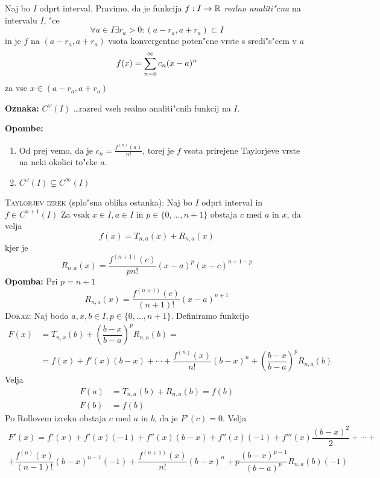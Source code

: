  Naj bo $I$ odprt interval. Pravimo, da je funkcija $f: I \to \mathbb{R}$ \emph{realno analiti"cna} na intervalu $I$, "ce
\begin{equation*}
\forall a \in I \exists r_a > 0: (a - r_a, a + r_a) \subset I
\end{equation*}
in je $f$ na $(a - r_a, a + r_a)$ vsota konvergentne poten"cne vrste s sredi"s"cem v $a$
\begin{equation*}
f(x) = \sum_{n = 0}^{\infty} c_n (x - a)^n
\end{equation*}
za vse $x \in (a - r_a, a + r_a)$

\textbf{Oznaka:} $C^\omega (I)$ \dots razred vseh realno analiti"cnih funkcij na $I$.

\textbf{Opombe:}
\begin{enumerate}
    \item Od prej vemo, da je $c_n = \frac{f^{(n)} (a)}{n!}$, torej je $f$ vsota prirejene Taylorjeve vrste na neki okolici to"cke $a$.
    \item $C^\omega (I) \subsetneq C^\infty (I)$
\end{enumerate}
%
\textsc{Taylorjev izrek} (splo"sna oblika ostanka): Naj bo $I$ odprt interval in $f \in C^{n+1}(I)$ Za vsak $x \in I, a \in I$ in $p \in \{ 0, \ldots, n + 1 \}$ obstaja $c$ med $a$ in $x$, da velja
\begin{equation*}
f(x) = T_{n, a}(x) + R_{n, a}(x)
\end{equation*}
kjer je
\begin{equation*}
R_{n, a}(x) = \dfrac{f^{(n+1)} (c)}{p n!} (x-a)^p (x-c)^{n+1 - p}
\end{equation*}
\textbf{Opomba:} Pri $p = n+1$
\begin{equation*}
R_{n, a}(x) = \dfrac{f^{(n+1)} (c)}{(n+1)!} (x - a)^{n+1}
\end{equation*}
\textsc{Dokaz:} Naj bodo $a, x, b \in I, p \in \{ 0, \ldots, n+1 \}$. Definiramo funkcijo
\begin{align*}
F(x) &= T_{n, x} (b) + \left( \dfrac{b - x}{b - a} \right)^p R_{n, a}(b) = \\
&= f(x) + f'(x) (b-x) + \cdots + \dfrac{f^{(n)}(x)}{n!} (b - x)^n + \left( \dfrac{b-x}{b-a} \right)^p R_{n, a}(b)
\end{align*}
Velja
\begin{align*}
F(a) &= T_{n, a}(b) + R_{n, a}(b) = f(b) \\
F(b) &= f(b)
\end{align*}
Po Rollovem izreku obstaja $c$ med $a$ in $b$, da je $F'(c) = 0$. Velja
\begin{multline*}
F'(x) = f'(x) + f'(x)(-1) + f''(x)(b-x) + f''(x)(-1) + f'''(x)\dfrac{(b-x)^2}{2} + \cdots + \\
+\dfrac{f^{(n)}(x)}{(n-1)!} (b-x)^{n-1} (-1) + \dfrac{f^{(n+1)}(x)}{n!} (b-x)^n + p \dfrac{(b-x)^{p-1}}{(b-a)^p} R_{n, a}(b) (-1)
\end{multline*}
